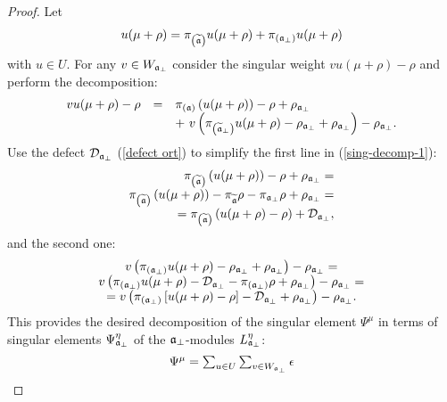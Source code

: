 \documentclass[12pt]{article}
\theoremstyle{definition}
\newcommand{\af}{\mathfrak{a}}
\newcommand{\aft}{\widetilde{\mathfrak{a}}}
\begin{document}
\begin{proof}
Let
\[
u(\mu +\rho )=\pi _{\left( \aft\right) }u(\mu +\rho )+\pi _{\left(
\frak{a}_{\perp }\right) }u(\mu +\rho )
\]
with $u\in U$. For any $v\in W_{\frak{a}_{\bot }}$ consider
the singular weight $vu(\mu +\rho )-\rho $ and perform the decomposition:
\begin{equation}
\begin{array}{lcl}
vu(\mu +\rho )-\rho  & = & \pi _{\left( \frak{a}\right) }\left( u(\mu +\rho
)\right) -\rho +\rho _{\frak{a}_{\perp }}
\\
&  & +\ v\left( \pi _{\left( \aft_{\perp }\right) }u(\mu
+\rho )-\rho _{\frak{a}_{\perp }}+\rho _{\frak{a}_{\perp }}\right) -\rho _{%
\frak{a}_{\perp }} .
\end{array}
\label{sing-decomp-1}
\end{equation}
Use the defect $\mathcal{D}_{\frak{a}_{\bot }}$ (\ref{defect ort}) to
simplify the first line in (\ref{sing-decomp-1}):
\[
\begin{array}{r}
\pi _{\left( \aft\right) }\left( u(\mu +\rho )\right) -\rho +\rho _{%
\frak{a}_{\perp }}= \\
\pi _{\left( \aft\right) }\left( u(\mu +\rho )\right) -\pi _{\aft%
}\rho -\pi _{\af_{\bot }}\rho +\rho _{\frak{a}_{\bot }}= \\
=\pi _{\left( \aft\right) }\left( u(\mu +\rho )-\rho \right) +\mathcal{D}%
_{\frak{a}_{\bot }},
\end{array}
\]
and the second one:
\[
\begin{array}{c}
v\left( \pi _{\left( \frak{a}_{\perp }\right) }u(\mu +\rho
)-\rho _{\frak{a}_{\perp }}+\rho _{\frak{a}_{\perp }}\right) -\rho _{\frak{a}%
_{\perp }}= \\
v\left( \pi _{\left( \frak{a}_{\bot }\right) }u(\mu +\rho )-%
\mathcal{D}_{\frak{a}_{\bot }}-\pi _{\left( \frak{a}_{\bot }\right) }\rho
+\rho _{\frak{a}_{\bot }}\right)
-\rho _{\frak{a}_{\bot }}= \\
=v\left( \pi _{\left( \frak{a}_{\bot }\right) }\left[ u(\mu
+\rho )-\rho \right] -\mathcal{D}_{\frak{a}_{\bot }}+\rho _{\frak{a}_{\bot
}}\right) -\rho _{\frak{a}_{\bot }}.
\end{array}
\]
This provides the desired decomposition of the singular element $%
\Psi ^{\mu }$ in terms of singular elements $\Psi _{\frak{a}%
_{\perp }}^{\eta }$ of the $\frak{a}_{\perp }$-modules $L_{%
\frak{a}_{\perp }}^{\eta }$:
\begin{equation}
\begin{array}{l}
\Psi ^{\mu }=\sum_{u\in U}\sum_{v\in W_{\frak{a}_{\perp }}}\epsilon

\end{array}
\end{equation}
\end{proof}
\end{document}
